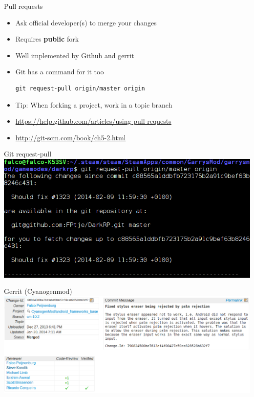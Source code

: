 \documentclass[10pt,a4paper]{beamer}
\begin{document}
\begin{frame}[fragile]{Pull requests}
\begin{itemize}
\item Ask official developer(s) to merge your changes
\item Requires \textbf{public} fork
\item Well implemented by Github and gerrit
\item Git has a command for it too
\begin{verbatim}git request-pull origin/master origin\end{verbatim}
\item Tip: When forking a project, work in a topic branch
\item \href{https://help.github.com/articles/using-pull-requests}{\color{blue}https://help.github.com/articles/using-pull-requests}
\item \href{http://git-scm.com/book/ch5-2.html}{\color{blue}http://git-scm.com/book/ch5-2.html}
\end{itemize}
\end{frame}

\begin{frame}{Git request-pull}
\includegraphics[width=\linewidth]{gitrequestpull.png}
\end{frame}

\begin{frame}{Gerrit (Cyanogenmod)}
\includegraphics[width=\linewidth]{gerrit.png}
\end{frame}
\end{document}
